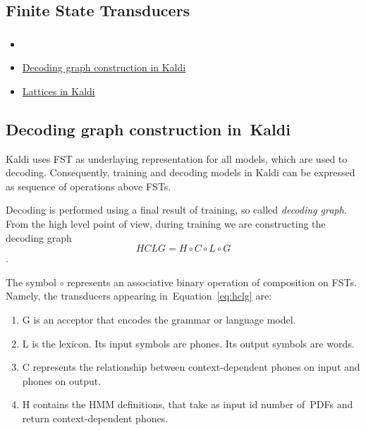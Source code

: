 \subsection{Finite State Transducers} 
\label{sec:fst}



\subsubsection*{} %

\begin{itemize}
    \item {}
    \item \href{http://kaldi.sourceforge.net/graph.html} {Decoding graph construction in Kaldi}
    \item \href{http://kaldi.sourceforge.net/lattices.html} {Lattices in Kaldi}
\end{itemize}

\subsection{Decoding graph construction in~Kaldi} %
Kaldi uses \ac{FST} as underlaying representation for all models, which are used to decoding. Consequently, 
training and decoding models in Kaldi can be expressed as sequence of operations above \acp{FST}.

Decoding is performed using a final result of training, so called {\it decoding graph}. 
From the high level point of view,
during training we are constructing the decoding graph 
\begin{equation} \label{eq:hclg}
HCLG = H\circ C\circ L\circ G
\end{equation}.

The symbol $\circ$ represents an associative binary operation of composition on \acp{FST}.
Namely, the transducers appearing in~Equation~\ref{eq:hclg} are:
\begin{enumerate}
    \item G is an acceptor that encodes the grammar or language model.
    \item L is the lexicon. Its input symbols are phones. Its output symbols are words.
    \item C represents the relationship between context-dependent phones on input and phones on output.
    \item H contains the \ac{HMM} definitions, that take as input id number of~\acp{PDF} and return context-dependent phones.
\end{enumerate}

